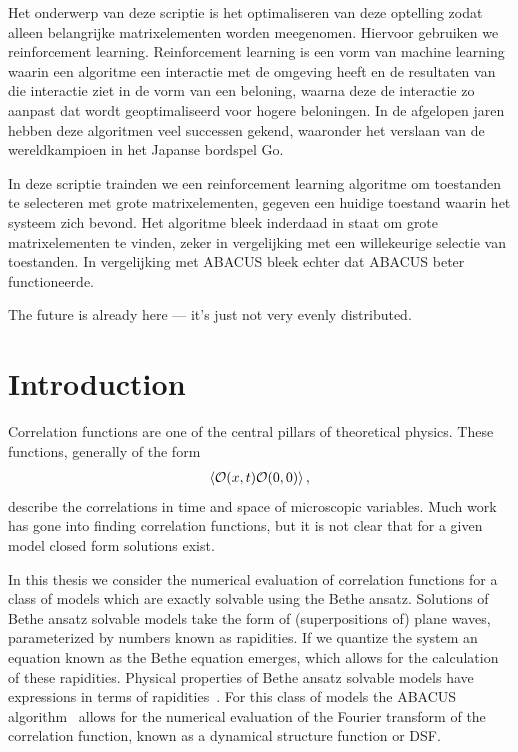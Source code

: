 \documentclass[11pt, a4paper]{report} %
\begin{document}
Het onderwerp van deze scriptie is het optimaliseren van deze optelling zodat alleen belangrijke matrixelementen worden meegenomen.
Hiervoor gebruiken we reinforcement learning.
Reinforcement learning is een vorm van machine learning waarin een algoritme een interactie met de omgeving heeft en de resultaten van die interactie ziet in de vorm van een beloning, waarna deze de interactie zo aanpast dat wordt geoptimaliseerd voor hogere beloningen.
In de afgelopen jaren hebben deze algoritmen veel successen gekend, waaronder het verslaan van de wereldkampioen in het Japanse bordspel Go.

In deze scriptie trainden we een reinforcement learning algoritme om toestanden te selecteren met grote matrixelementen, gegeven een huidige toestand waarin het systeem zich bevond.
Het algoritme bleek inderdaad in staat om grote matrixelementen te vinden, zeker in vergelijking met een willekeurige selectie van toestanden.
In vergelijking met ABACUS bleek echter dat ABACUS beter functioneerde. 

\tableofcontents


\begin{savequote}[50mm]
The future is already here --- it's just not very evenly distributed.
\end{savequote}


\chapter{Introduction}

Correlation functions are one of the central pillars of theoretical physics.
These functions, generally of the form
\begin{align}
  \label{eq:55}
  \expval{\mathcal{O}(x,t)\mathcal{O}(0,0)},
\end{align}
describe the correlations in time and space of microscopic variables.
Much work has gone into finding correlation functions, but it is not clear that for a given model closed form solutions exist.

In this thesis we consider the numerical evaluation of correlation functions for a class of models which are exactly solvable using the Bethe ansatz.
Solutions of Bethe ansatz solvable models take the form of (superpositions of) plane waves, parameterized by numbers known as rapidities.
If we quantize the system an equation known as the Bethe equation emerges, which allows for the calculation of these rapidities.
Physical properties of Bethe ansatz solvable models have expressions in terms of rapidities~\cite{Korepin1993}.
For this class of models the ABACUS algorithm~\cite{Caux2009} allows for the numerical evaluation of the Fourier transform of the correlation function, known as a dynamical structure function or DSF.\@
\end{document}
